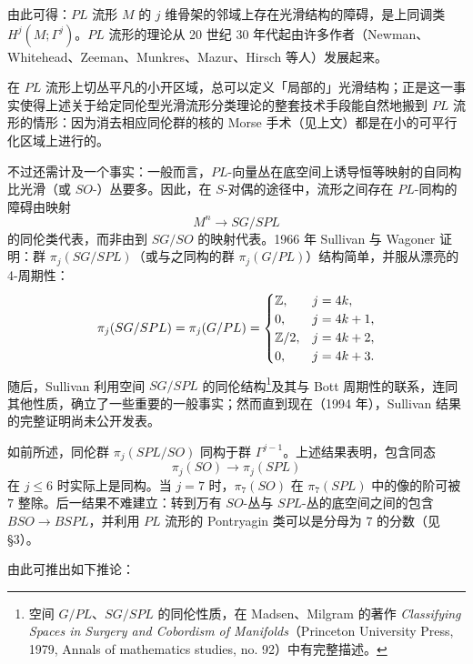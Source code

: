 由此可得：$PL$ 流形 $M$ 的 $j$ 维骨架的邻域上存在光滑结构的障碍，是上同调类 $H^j(M;\Gamma^j)$。$PL$ 流形的理论从 20 世纪 30 年代起由许多作者（Newman、Whitehead、Zeeman、Munkres、Mazur、Hirsch 等人）发展起来。

在 $PL$ 流形上切丛平凡的小开区域，总可以定义「局部的」光滑结构；正是这一事实使得上述关于给定同伦型光滑流形分类理论的整套技术手段能自然地搬到 $PL$ 流形的情形：因为消去相应同伦群的核的 Morse 手术（见上文）都是在小的可平行化区域上进行的。

不过还需计及一个事实：一般而言，$PL$-向量丛在底空间上诱导恒等映射的自同构比光滑（或 $SO$-）丛要多。因此，在 $S$-对偶的途径中，流形之间存在 $PL$-同构的障碍由映射
\[
M^n\longrightarrow SG/SPL
\]
的同伦类代表，而非由到 $SG/SO$ 的映射代表。1966 年 Sullivan 与 Wagoner 证明：群 $\pi_j(SG/SPL)$（或与之同构的群 $\pi_j(G/PL)$）结构简单，并服从漂亮的 4-周期性：
\[
\pi_j(SG/SPL)=\pi_j(G/PL)=
\begin{cases}
\mathbb{Z}, & j=4k,\\
0, & j=4k+1,\\
\mathbb{Z}/2, & j=4k+2,\\
0, & j=4k+3.
\end{cases}
\]
随后，Sullivan 利用空间 $SG/SPL$ 的同伦结构\footnote{空间 $G/PL$、$SG/SPL$ 的同伦性质，在 Madsen、Milgram 的著作 \emph{Classifying Spaces in Surgery and Cobordism of Manifolds}（Princeton University Press, 1979, Annals of mathematics studies, no. 92）中有完整描述。}及其与 Bott 周期性的联系，连同其他性质，确立了一些重要的一般事实；然而直到现在（1994 年），Sullivan 结果的完整证明尚未公开发表。

如前所述，同伦群 $\pi_j(SPL/SO)$ 同构于群 $\Gamma^{j-1}$。上述结果表明，包含同态
\[
\pi_j(SO)\longrightarrow\pi_j(SPL)
\]
在 $j\le6$ 时实际上是同构。当 $j=7$ 时，$\pi_7(SO)$ 在 $\pi_7(SPL)$ 中的像的阶可被 $7$ 整除。后一结果不难建立：转到万有 $SO$-丛与 $SPL$-丛的底空间之间的包含 $BSO\to BSPL$，并利用 $PL$ 流形的 Pontryagin 类可以是分母为 $7$ 的分数（见 §3）。

由此可推出如下推论：

